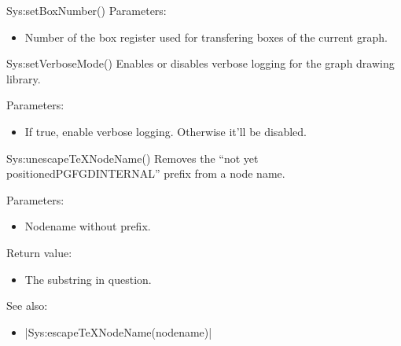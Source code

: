 \begin{luacommand}{{Sys:setBoxNumber}()}
Parameters:
\begin{itemize}
	\item[]  \subitem Number of the box register used for transfering boxes of the current graph.
\end{itemize}



\end{luacommand}\begin{luacommand}{{Sys:setVerboseMode}()}
Enables or disables verbose logging for the graph drawing library.

Parameters:
\begin{itemize}
	\item[]  \subitem If true, enable verbose logging. Otherwise it'll be disabled.
\end{itemize}



\end{luacommand}\begin{luacommand}{{Sys:unescapeTeXNodeName}()}
Removes the ``not yet positionedPGFGDINTERNAL'' prefix from a node name.

Parameters:
\begin{itemize}
	\item[]  \subitem Nodename without prefix.
\end{itemize}


Return value:
\begin{itemize} \item[] The substring in question. \end{itemize}


See also:
\begin{itemize}
	\item[] |Sys:escapeTeXNodeName(nodename)|
\end{itemize}

\end{luacommand}
